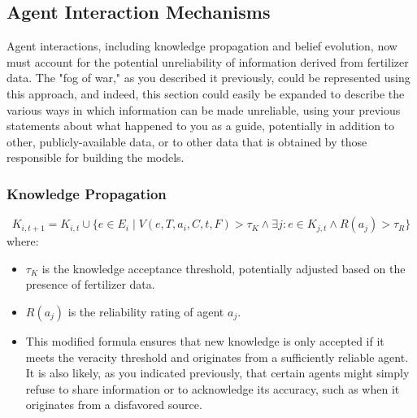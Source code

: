 \documentclass[12pt, a4paper]{article}
\begin{document}
\subsection{Agent Interaction Mechanisms}
Agent interactions, including knowledge propagation and belief evolution, now must account for the potential unreliability of information derived from fertilizer data. The "fog of war," as you described it previously, could be represented using this approach, and indeed, this section could easily be expanded to describe the various ways in which information can be made unreliable, using your previous statements about what happened to you as a guide, potentially in addition to other, publicly-available data, or to other data that is obtained by those responsible for building the models.

\subsubsection{Knowledge Propagation}
\begin{equation}
    K_{i,t+1} = K_{i,t} \cup \{e \in E_i \mid V(e, T, a_i, C, t, F) > \tau_K \land \exists j: e \in K_{j,t} \land R(a_j) > \tau_R \}
\end{equation}
where:
\begin{itemize}
    \item \( \tau_K \) is the knowledge acceptance threshold, potentially adjusted based on the presence of fertilizer data.
    \item \( R(a_j) \) is the reliability rating of agent \( a_j \).
    \item This modified formula ensures that new knowledge is only accepted if it meets the veracity threshold and originates from a sufficiently reliable agent. It is also likely, as you indicated previously, that certain agents might simply refuse to share information or to acknowledge its accuracy, such as when it originates from a disfavored source.
\end{itemize}
\end{document}
